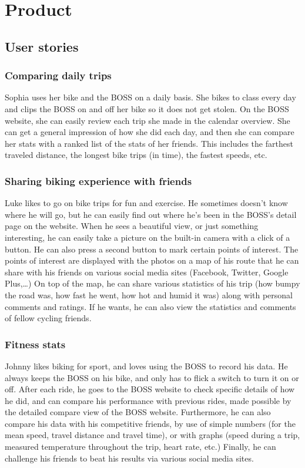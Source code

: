 \section{Product}
\subsection{User stories}
\subsubsection{Comparing daily trips}
Sophia uses her bike and the BOSS on a daily basis. 
She bikes to class every day and clips the BOSS on and off her bike so it does not get stolen. 
On the BOSS website, she can easily review each trip she made in the calendar overview. 
She can get a general impression of how she did each day, and then she can compare her stats with a ranked list of the stats of her friends. 
This includes the farthest traveled distance, the longest bike trips (in time), the fastest speeds, etc.

\subsubsection{Sharing biking experience with friends}
Luke likes to go on bike trips for fun and exercise. 
He sometimes doesn’t know where he will go, but he can easily find out where he’s been in the BOSS’s detail page on the website. 
When he sees a beautiful view, or just something interesting, he can easily take a picture on the built-in camera with a click of a button. 
He can also press a second button to mark certain points of interest. 
The points of interest are displayed with the photos on a map of his route that he can share with his friends on various social media sites (Facebook, Twitter, Google Plus,…) On top of the map, he can share various statistics of his trip (how bumpy the road was, how fast he went, how hot and humid it was) along with personal comments and ratings. 
If he wants, he can also view the statistics and comments of fellow cycling friends. 

\subsubsection{Fitness stats}
Johnny likes biking for sport, and loves using the BOSS to record his data. 
He always keeps the BOSS on his bike, and only has to flick a switch to turn it on or off. 
After each ride, he goes to the BOSS website to check specific details of how he did, and can compare his performance with previous rides, made possible by the detailed compare view of the BOSS website. 
Furthermore, he can also compare his data with his competitive friends, by use of simple numbers (for the mean speed, travel distance and travel time), or with graphs (speed during a trip, measured temperature throughout the trip, heart rate, etc.) Finally, he can challenge his friends to beat his results via various social media sites.

